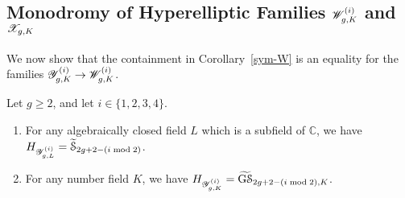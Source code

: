 \subsection{Monodromy of Hyperelliptic Families $\standardTarget g i K$ and $\hyperelliptic g K$}
\label{subsection:monodromy-of-families}

We now show that the containment in Corollary~\ref{sym-W} is an equality for the families $\standardFamily g i K \to \standardTarget g i K$.
\begin{lemma} \label{lemma:monodromy-std}
Let $g \geq 2$, and let $i \in \{1, 2, 3, 4\}$. 
\begin{enumerate}[label=(\roman*)]
	\item For any algebraically closed field $L$ which is a subfield of $\mathbb C$, we have $\mono_{\standardFamily g i L}= \hyphat_{2g+2-(i \bmod 2)}$. 
	\item For any number field $K$, we have $\mono_{\standardFamily g i K}= \grouphypboth g {(i \bmod 2)} {K}$. 
\end{enumerate} 
\end{lemma}
